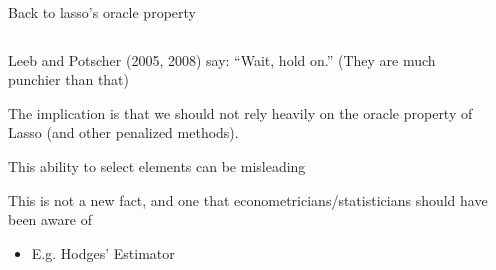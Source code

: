 \documentclass[notes,11pt, aspectratio=169]{beamer}
\newenvironment{wideitemize}{\itemize\addtolength{\itemsep}{10pt}}{\enditemize}
\begin{document}
\begin{frame}{Back to lasso's  oracle property}
  \begin{columns}[T] %
    \begin{column}{.8\textwidth}
      \begin{wideitemize}
      \item Leeb and Potscher (2005, 2008) say:  ``Wait, hold on.'' (They are much punchier than that)
      \item The implication is that we should not rely heavily on the
        oracle property of Lasso (and other penalized methods).
      \item This ability to select elements can be misleading
      \item This is not a new fact, and one that econometricians/statisticians should have been aware of
        \begin{itemize}
        \item E.g. Hodges' Estimator
        \end{itemize}
      \end{wideitemize}
    \end{column}%
  \hfill%
  \begin{column}{.5\textwidth}
  \end{column}
\end{columns}
\end{frame}
\end{document}
